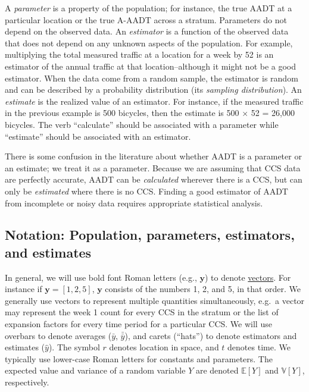 \documentclass[11pt]{article}
\begin{document}
A \emph{parameter} is a property of the population; for instance, the
true AADT at a particular location or the true A-AADT across a stratum.
Parameters do not depend on the observed data. An \emph{estimator} is a
function of the observed data that does not depend on any unknown
aspects of the population. For example, multiplying the total measured
traffic at a location for a week by 52 is an estimator of the annual
traffic at that location--although it might not be a good estimator.
When the data come from a random sample, the estimator is random and can
be described by a probability distribution (its \emph{sampling
distribution}). An \emph{estimate} is the realized value of an
estimator. For instance, if the measured traffic in the previous example
is 500 bicycles, then the estimate is 500 \(\times\) 52 = 26,000
bicycles. The verb ``calculate'' should be associated with a parameter
while ``estimate'' should be associated with an estimator.

There is some confusion in the literature about whether AADT is a
parameter or an estimate; we treat it as a parameter. Because we are
assuming that CCS data are perfectly accurate, AADT can be
\emph{calculated} wherever there is a CCS, but can only be
\emph{estimated} where there is no CCS. Finding a good estimator of AADT
from incomplete or noisy data requires appropriate statistical analysis.

    \subsection{Notation: Population, parameters, estimators, and
estimates}\label{notation-population-parameters-estimators-and-estimates}

In general, we will use bold font Roman letters (e.g., \(\mathbf{y}\))
to denote
\href{https://en.wikipedia.org/wiki/Euclidean_vector}{vectors}. For
instance if \(\mathbf{y} = [1, 2, 5]\), \(\mathbf{y}\) consists of the
numbers 1, 2, and 5, in that order. We generally use vectors to
represent multiple quantities simultaneously, e.g.~a vector may
represent the week 1 count for every CCS in the stratum or the list of
expansion factors for every time period for a particular CCS. We will
use overbars to denote averages (\(\bar{y}\), \(\bar{\bar{y}}\)), and
carets (``hats'') to denote estimators and estimates (\(\hat{y}\)). The
symbol \(r\) denotes location in space, and \(t\) denotes time. We
typically use lower-case Roman letters for constants and parameters. The
expected value and variance of a random variable \(Y\) are denoted
\(\mathbb{E} [Y]\) and \(\mathbb{V}[Y]\), respectively.
\end{document}
